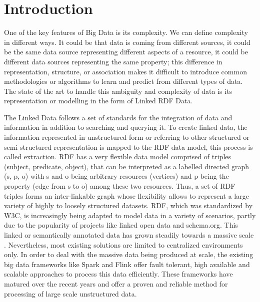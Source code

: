 \chapter{Introduction}
\label{chapter:intro}

One of the key features of Big Data is its complexity. 
We can define complexity in different ways.
It could be that data is coming from different sources, it could be the same data source representing different aspects of a resource, it could be different data sources representing the same property; this difference in representation, structure, or association makes it difficult to introduce common methodologies or algorithms to learn and predict from different types of data. 
The state of the art to handle this ambiguity and complexity of data is its representation or modelling in the form of Linked RDF Data.

The Linked Data follows a set of standards for the integration of data and information in addition to searching and querying it. 
To create linked data, the information represented in unstructured form or referring to other structured or semi-structured representation is mapped to the \gls{RDF} data model, this process is called extraction. 
\gls{RDF} has a very flexible data model comprised of triples (subject, predicate, object), that can be interpreted as a labelled directed graph (s, p, o) with s and o being arbitrary resources (vertices) and p being the property (edge from s to o) among these two resources. 
Thus, a set of \gls{RDF} triples forms an inter-linkable graph whose flexibility allows to represent a large variety of highly to loosely structured datasets. 
RDF, which was standardized by \gls{W3C}, is increasingly being adapted to model data in a variety of scenarios, partly due to the popularity of projects like linked open data and schema.org. 
This linked or semantically annotated data has grown steadily towards a massive scale .
Nevertheless, most existing solutions are limited to centralized environments only.
In order to deal with the massive data being produced at scale, the existing big data frameworks like Spark and Flink offer fault tolerant, high available and scalable approaches to process this data efficiently. 
These frameworks have matured over the recent years and offer a proven and reliable method for processing of large scale unstructured data.

